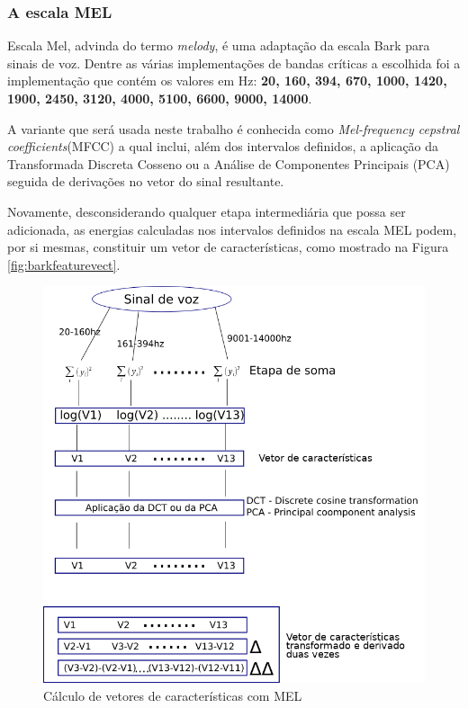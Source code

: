	\subsubsection{A escala MEL}
		\par Escala Mel, advinda do termo \textit{melody},  é uma adaptação da escala Bark para sinais de voz. Dentre as várias implementações de bandas críticas a escolhida foi a implementação que contém os valores em Hz: \textbf{20, 160, 394, 670, 1000, 1420, 1900, 2450, 3120, 4000, 5100, 6600, 9000, 14000}.
		\par A variante que será usada neste trabalho é conhecida como \textit{Mel-frequency cepstral coefficients}(MFCC) a qual inclui, além dos intervalos definidos, a aplicação da Transformada Discreta Cosseno \cite{salomon2007data} ou a Análise de Componentes Principais (PCA) \cite{jolliffe2006principal} seguida de derivações no vetor do sinal resultante.
		\par Novamente, desconsiderando qualquer etapa intermediária que possa ser adicionada, as energias calculadas nos intervalos definidos na escala MEL podem, por si mesmas, constituir um vetor de características, como mostrado na Figura \ref{fig:barkfeaturevect}.
		\begin{figure}[h]
			\centering
			\includegraphics[width=0.8\linewidth]{images/melFeatureVect}
			\caption{Cálculo de vetores de características com MEL}
			\label{fig:melfeaturevect}
		\end{figure}
	

